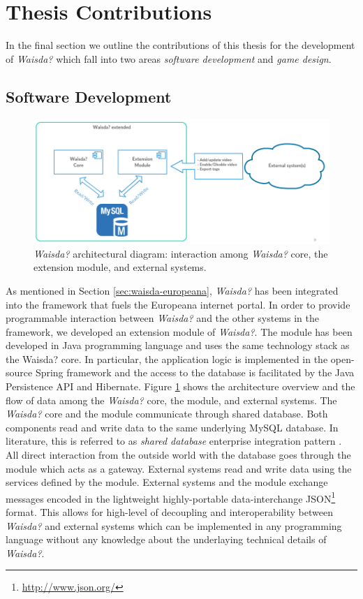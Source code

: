 \section{Thesis Contributions} 
In the final section we outline the contributions of this thesis for the development of \textit{Waisda?} which fall into two areas \textit{software development} and \textit{game design}.
\subsection{Software Development}\label{chap:waisda:thesis-soft}

\begin{figure}[t!]
\centering
\includegraphics[width=\columnwidth]{waisda-diagram} 
\caption{\textit{Waisda?} architectural diagram: interaction among \textit{Waisda?} core, the extension module, and external systems.}
\label{waisda-diagram}
\end{figure}

As mentioned in Section \ref{sec:waisda-europeana}, \textit{Waisda?} has been integrated into the framework that fuels the Europeana internet portal. In order to provide programmable interaction between \textit{Waisda?} and the other systems in the framework, we developed an extension module of \textit{Waisda?}. The module has been developed in Java programming language and uses the same technology stack as the Waisda? core. In particular, the application logic is implemented in the open-source Spring framework and the access to the database is facilitated by the Java Persistence API and Hibernate. Figure \ref{waisda-diagram} shows the architecture overview and the flow of data among the \textit{Waisda?} core, the module, and external systems. The \textit{Waisda?} core and the module communicate through shared database. Both components read and write data to the same underlying MySQL database. In literature, this is referred to as \textit{shared database} enterprise integration pattern \cite{Hohpe:2003:EIP:940308}. All direct interaction from the outside world with the database goes through the module which acts as a gateway. External systems read and write data using the services defined by the module. External systems and the module exchange messages encoded in the lightweight highly-portable data-interchange JSON\footnote{\url{http://www.json.org/}} format. This allows for high-level of decoupling and interoperability between \textit{Waisda?} and external systems which can be implemented in any programming language without any knowledge about the underlaying technical details of \textit{Waisda?}.


